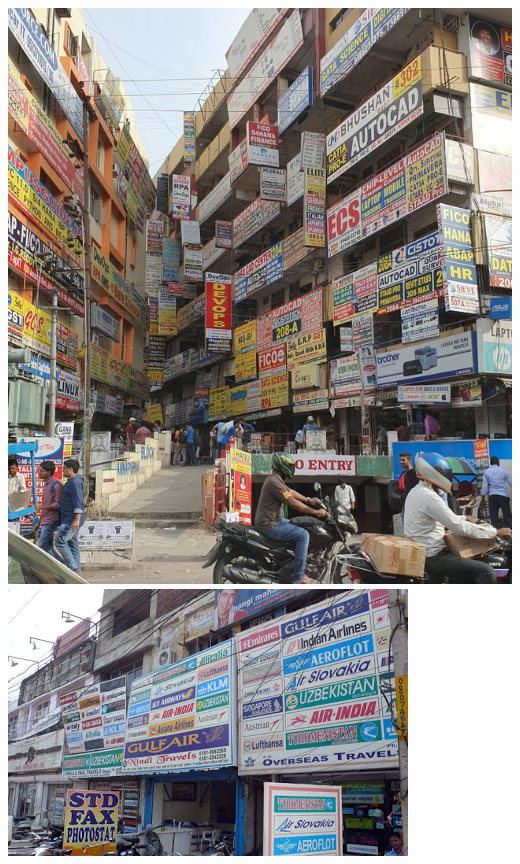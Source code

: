 \documentclass{beamer}
\begin{document}
     \begin{frame}
     \begin{columns}
                \includegraphics[height=.99\textwidth,width=.99\textwidth]{img/banners.jpg}
            \includegraphics[height=.99\textwidth,width=.99\textwidth]{img/banners2.JPG}
        \end{columns}
     \end{frame}
    
\end{document}
